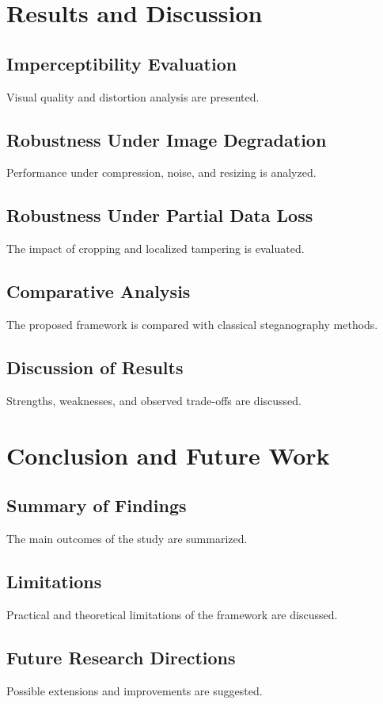 \documentclass[12pt,a4paper,oneside]{report}
\begin{document}
	
	\chapter{Results and Discussion}
	\section{Imperceptibility Evaluation}
	Visual quality and distortion analysis are presented.
	
	\section{Robustness Under Image Degradation}
	Performance under compression, noise, and resizing is analyzed.
	
	\section{Robustness Under Partial Data Loss}
	The impact of cropping and localized tampering is evaluated.
	
	\section{Comparative Analysis}
	The proposed framework is compared with classical steganography methods.
	
	\section{Discussion of Results}
	Strengths, weaknesses, and observed trade-offs are discussed.
	
	
	\chapter{Conclusion and Future Work}
	\section{Summary of Findings}
	The main outcomes of the study are summarized.
	
	\section{Limitations}
	Practical and theoretical limitations of the framework are discussed.
	
	\section{Future Research Directions}
	Possible extensions and improvements are suggested.
	
	
	
	
\end{document}

